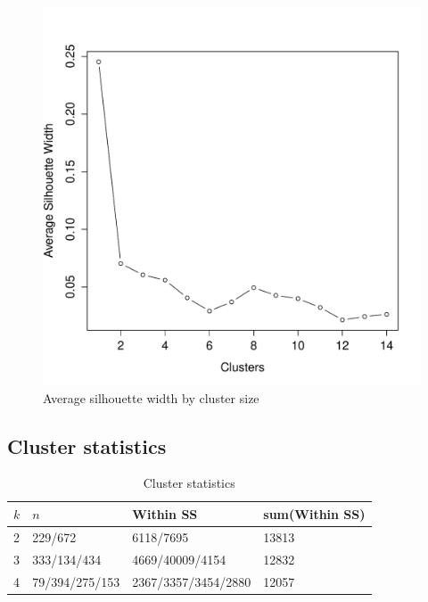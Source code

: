 \documentclass[letterpaper,12pt]{article}
\begin{document}
\begin{figure}[h]
  \centering
  \includegraphics[width=\linewidth]{asw.pdf}
  \caption{Average silhouette width by cluster size}
  \label{fig:asw}
\end{figure}


\subsection{Cluster statistics}
\begin{table}[h]
  \centering
  \begin{tabular}{l|l|l|l}
    $k$ & $n$ & Within SS & sum(Within SS) \\
    \hline
    2 & 229/672 & 6118/7695 & 13813 \\
    3 & 333/134/434 & 4669/40009/4154 & 12832 \\
    4 & 79/394/275/153 & 2367/3357/3454/2880  & 12057 \\
  \end{tabular}
  \caption{Cluster statistics}
  \label{tab:cluster-statistics}
\end{table}
\end{document}
